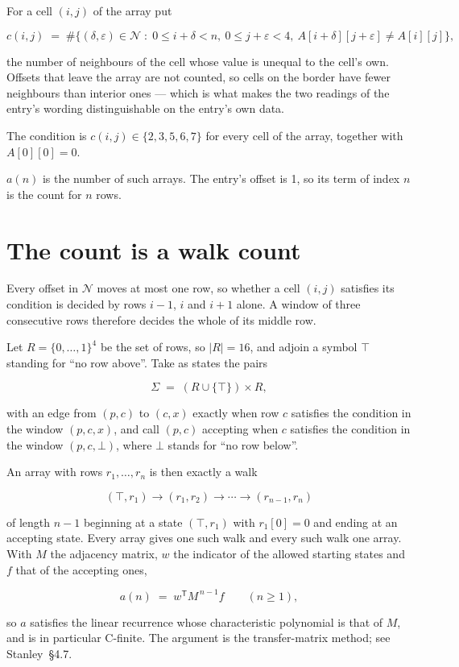 \documentclass[11pt]{article}
\theoremstyle{definition}
\begin{document}
For a cell $(i,j)$ of the array put

\[c(i,j) \;=\; \#\bigl\{(\delta,\varepsilon)\in\mathcal{N} \;:\; 0\le i+\delta<n,\ 0\le j+\varepsilon<4,\ A[i+\delta][j+\varepsilon] \neq A[i][j]\bigr\},\]

the number of neighbours of the cell whose value is unequal to the cell's own. Offsets that leave the array are not counted, so cells on the border have fewer neighbours than interior ones --- which is what makes the two readings of the entry's wording distinguishable on the entry's own data.

The condition is $c(i,j) \in \{2, 3, 5, 6, 7\}$ for every cell of the array, together with $A[0][0]=0$.

$a(n)$ is the number of such arrays. The entry's offset is 1, so its term of index $n$ is the count for $n$ rows.

\section{The count is a walk count}

Every offset in $\mathcal{N}$ moves at most one row, so whether a cell $(i,j)$ satisfies its condition is decided by rows $i-1$, $i$ and $i+1$ alone. A window of three consecutive rows therefore decides the whole of its middle row.

Let $R = \{0,\dots,1\}^{4}$ be the set of rows, so $|R| = 16$, and adjoin a symbol $\top$ standing for ``no row above''. Take as states the pairs

\[\Sigma \;=\; (R \cup \{\top\}) \times R,\]

with an edge from $(p,c)$ to $(c,x)$ exactly when row $c$ satisfies the condition in the window $(p,c,x)$, and call $(p,c)$ accepting when $c$ satisfies the condition in the window $(p,c,\bot)$, where $\bot$ stands for ``no row below''.

An array with rows $r_1,\dots,r_n$ is then exactly a walk

\[(\top,r_1) \to (r_1,r_2) \to \cdots \to (r_{n-1},r_n)\]

of length $n-1$ beginning at a state $(\top,r_1)$ with $r_1[0]=0$ and ending at an accepting state. Every array gives one such walk and every such walk one array. With $M$ the adjacency matrix, $w$ the indicator of the allowed starting states and $f$ that of the accepting ones,

\[a(n) \;=\; w^{\mathsf T} M^{\,n-1} f \qquad (n \ge 1),\]

so $a$ satisfies the linear recurrence whose characteristic polynomial is that of $M$, and is in particular C-finite. The argument is the transfer-matrix method; see Stanley~\S4.7.
\end{document}

